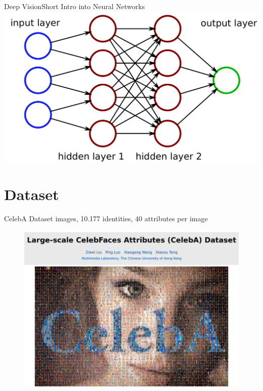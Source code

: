 \documentclass{beamer}
\begin{document}
\begin{frame}{Deep Vision}{Short Intro into Neural Networks}
	\centering
	\includegraphics[width=0.61\linewidth]{figures/hiddenLayers}
\end{frame}

\section{Dataset}
\begin{frame}{CelebA Dataset \cite{website}}
 images,
	10.177 identities,
	40 attributes per image 
	\begin{figure}
		\centering
		\includegraphics[width=0.9\linewidth]{figures/CelebA}
		\label{fig:celebA}
	\end{figure}
\end{frame}
\end{document}

